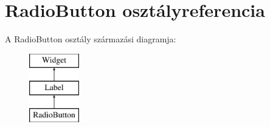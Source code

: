 \hypertarget{class_radio_button}{}\section{Radio\+Button osztályreferencia}
\label{class_radio_button}
A Radio\+Button osztály származási diagramja\+:\begin{figure}[H]
\begin{center}
\leavevmode
\includegraphics[height=3.000000cm]{class_radio_button}
\end{center}
\end{figure}
